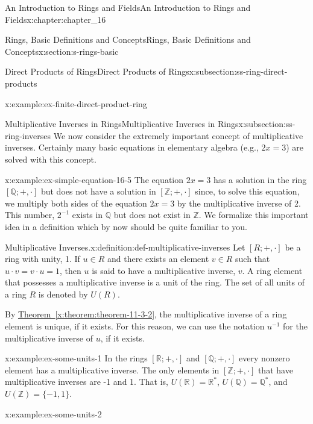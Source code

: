 \documentclass[oneside,10pt,]{book}
\newcommand{\xreffont}{\relax}
\numberwithin{equation}{section}
\begin{document}
\begin{chapterptx}{An Introduction to Rings and Fields}{}{An Introduction to Rings and Fields}{}{}{x:chapter:chapter_16}
\begin{sectionptx}{Rings, Basic Definitions and Concepts}{}{Rings, Basic Definitions and Concepts}{}{}{x:section:s-rings-basic}
\begin{subsectionptx}{Direct Products of Rings}{}{Direct Products of Rings}{}{}{x:subsection:ss-ring-direct-products}
\begin{example}{}{x:example:ex-finite-direct-product-ring}
\end{example}
\end{subsectionptx}
%
%
\typeout{************************************************}
\typeout{************************************************}
%
\begin{subsectionptx}{Multiplicative Inverses in Rings}{}{Multiplicative Inverses in Rings}{}{}{x:subsection:ss-ring-inverses}
We now consider the extremely important concept of multiplicative inverses. Certainly many basic equations in elementary algebra (e.g., \(2x = 3\)) are solved with this concept.%
\begin{example}{}{x:example:ex-simple-equation-16-5}%
The equation \(2x = 3\) has a solution in the ring \([\mathbb{Q}; +, \cdot ]\) but does not have a solution in \([\mathbb{Z}; +, \cdot ]\) since, to solve this equation, we  multiply both sides of the equation \(2x = 3\) by the multiplicative inverse of 2. This number, \(2^{-1}\) exists in \(\mathbb{Q}\) but does not exist in \(\mathbb{Z}\). We formalize this important idea in a definition which by now should be quite familiar to you.%
\end{example}
\begin{definition}{Multiplicative Inverses.}{x:definition:def-multiplicative-inverses}%
%
%
\label{g:notation:idm546594096512}%
Let \([R; +, \cdot ]\) be a ring with unity, 1.  If \(u \in R\) and there exists an element \(v \in  R\) such that \(u\cdot v = v\cdot u = 1\), then \(u\) is said to have a multiplicative inverse, \(v\). A ring element that possesses a multiplicative inverse is a unit of the ring. The set of all units of a ring \(R\) is denoted by \(U(R)\).%
\end{definition}
By \hyperref[x:theorem:theorem-11-3-2]{Theorem~{\xreffont\ref{x:theorem:theorem-11-3-2}}}, the multiplicative inverse of a ring element is unique, if it exists.   For this reason, we can use the notation \(u^{-1}\) for the multiplicative inverse of \(u\), if it exists.%
\begin{example}{}{x:example:ex-some-units-1}%
In the rings \([\mathbb{R}; +, \cdot]\) and \([\mathbb{Q}; +, \cdot]\) every nonzero element has a multiplicative inverse. The only elements in \([\mathbb{Z}; +, \cdot]\) that have multiplicative inverses are -1 and 1. That is, \(U(\mathbb{R}) = \mathbb{R}^*\), \(U(\mathbb{Q}) = \mathbb{Q}^*\), and \(U(\mathbb{Z}) = \{-1, 1\}\).%
\end{example}
\begin{example}{}{x:example:ex-some-units-2}%

\end{example}
\end{subsectionptx}
\end{sectionptx}
\end{chapterptx}
\end{document}
